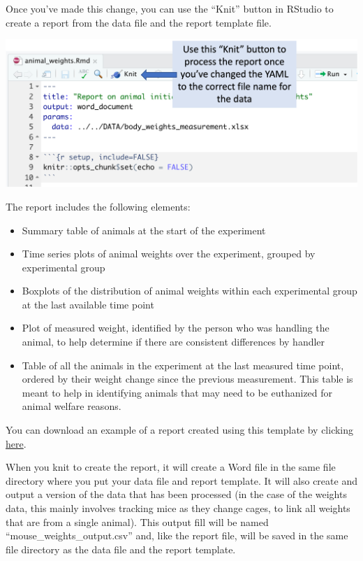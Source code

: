 \documentclass[
]{book}
\providecommand{\tightlist}{%
  \setlength{\itemsep}{0pt}\setlength{\parskip}{0pt}}
\begin{document}
Once you've made this change, you can use the ``Knit'' button in RStudio to
create a report from the data file and the report template file.

\includegraphics[width=1\linewidth]{figures/knit_button_for_weight_report}

The report includes the following elements:

\begin{itemize}
\tightlist
\item
  Summary table of animals at the start of the experiment
\item
  Time series plots of animal weights over the experiment, grouped by
  experimental group
\item
  Boxplots of the distribution of animal weights within each experimental
  group at the last available time point
\item
  Plot of measured weight, identified by the person who was handling the
  animal, to help determine if there are consistent differences by handler
\item
  Table of all the animals in the experiment at the last measured time point,
  ordered by their weight change since the previous measurement. This table
  is meant to help in identifying animals that may need to be euthanized for
  animal welfare reasons.
\end{itemize}

You can download an example of a report created using this template by
clicking \href{https://github.com/csu-impactb/CODING-TEAM-BOOKDOWN-/raw/main/templates/report_templates/animal_weights.docx}{here}.

When you knit to create the report, it will create a Word file in the same file
directory where you put your data file and report template. It will also create
and output a version of the data that has been processed (in the case of the
weights data, this mainly involves tracking mice as they change cages, to link
all weights that are from a single animal). This output fill will be named
``mouse\_weights\_output.csv'' and, like the report file, will be saved in the same
file directory as the data file and the report template.
\end{document}
